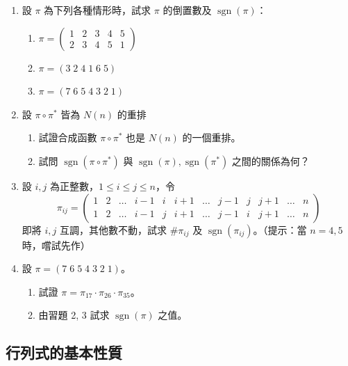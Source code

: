 \begin{enumerate}[label=\arabic*., leftmargin=2em]
  \item 設 $\pi$ 為下列各種情形時，試求 $\pi$ 的倒置數及 $\operatorname{sgn}(\pi)$：
  \begin{enumerate}[label=(\roman*)]
    \item $\pi = \begin{pmatrix} 1 & 2 & 3 & 4 & 5 \\ 2 & 3 & 4 & 5 & 1 \end{pmatrix}$
    \item $\pi = (3 \; 2 \; 4 \; 1 \; 6 \; 5)$
    \item $\pi = (7 \; 6 \; 5 \; 4 \; 3 \; 2 \; 1)$
  \end{enumerate}

  \item[\textbf{*2.}] 設 $\pi \circ \pi^*$ 皆為 $N(n)$ 的重排
  \begin{enumerate}[label=(\roman*)]
    \item 試證合成函數 $\pi \circ \pi^*$ 也是 $N(n)$ 的一個重排。
    \item 試問 $\operatorname{sgn}(\pi \circ \pi^*)$ 與 $\operatorname{sgn}(\pi), \operatorname{sgn}(\pi^*)$ 之間的關係為何？
  \end{enumerate}

  \item[\textbf{*3.}] 設 $i, j$ 為正整數，$1 \le i \le j \le n$，令
  \[ \pi_{ij} = \begin{pmatrix}
  1 & 2 & \dots & i-1 & i & i+1 & \dots & j-1 & j & j+1 & \dots & n \\
  1 & 2 & \dots & i-1 & j & i+1 & \dots & j-1 & i & j+1 & \dots & n
  \end{pmatrix} \]
  即將 $i, j$ 互調，其他數不動，試求 $\#\pi_{ij}$ 及 $\operatorname{sgn}(\pi_{ij})$。（提示：當 $n=4, 5$ 時，嚐試先作）

  \item 設 $\pi = (7 \; 6 \; 5 \; 4 \; 3 \; 2 \; 1)$。
  \begin{enumerate}[label=(\roman*)]
    \item 試證 $\pi = \pi_{17} \cdot \pi_{26} \cdot \pi_{35}$。
    \item 由習題 2, 3 試求 $\operatorname{sgn}(\pi)$ 之值。
  \end{enumerate}
\end{enumerate}

\subsection{行列式的基本性質}\label{sec:b6s-1-4}
\resetsectcounters

